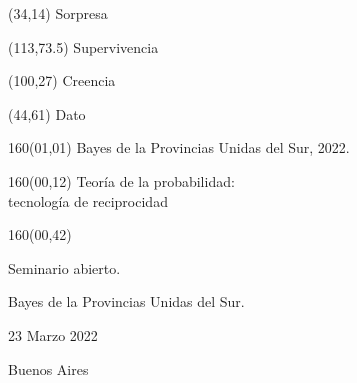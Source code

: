 \documentclass[shownotes,aspectratio=169]{beamer}
\begin{document}
\color{black!85}
\large

 

\begin{frame}
\begin{textblock}{80}(34,14)
 \huge \textcolor{black!50}{Sorpresa}
\end{textblock}

\begin{textblock}{47}(113,73.5)
\centering \LARGE  \textcolor{black!5}{Supervivencia}
\end{textblock}

\begin{textblock}{80}(100,27)
\LARGE  \textcolor{black!10}{Creencia}
\end{textblock}

\begin{textblock}{80}(44,61)
\LARGE  \textcolor{black!15}{Dato}
\end{textblock}

\begin{textblock}{160}(01,01)
\scriptsize \textcolor{black!50}{Bayes de la Provincias Unidas del Sur, 2022.}
\end{textblock}


{}
\end{frame}

\begin{frame}
\begin{textblock}{160}(00,12)
\centering
\huge Teoría de la probabilidad: \\ tecnología de reciprocidad
\end{textblock}

\begin{textblock}{160}(00,42) \centering

Seminario abierto.

Bayes de la Provincias Unidas del Sur.


\vspace{1.5cm}

23 Marzo 2022

\vspace{.3cm}

Buenos Aires
\end{textblock}



\end{frame}
\end{document}
